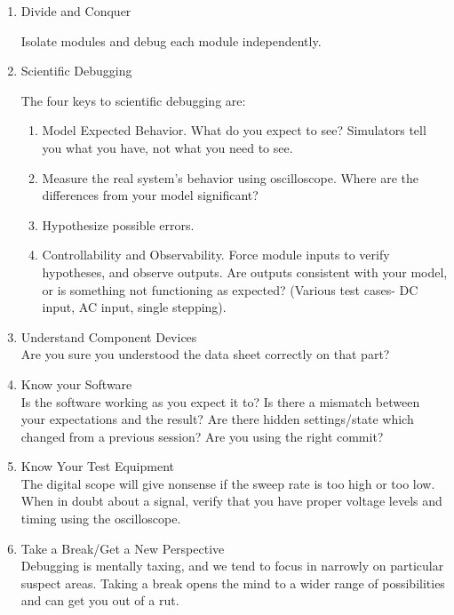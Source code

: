 \documentclass[11pt]{article}
\begin{document}
\begin{enumerate}
\item
Divide and Conquer

Isolate modules and debug each module independently.

\item 
Scientific Debugging

The four keys to scientific debugging are:
\begin{enumerate}
\item 
Model Expected Behavior. What do you expect to see?
Simulators tell you what you have, not what you need to see.
\item
Measure the real system's behavior using oscilloscope. 
Where are the differences from your model significant?
\item
Hypothesize possible errors.
\item
Controllability and Observability. Force module inputs
to verify hypotheses, and observe outputs. Are outputs consistent
with your model, or is something not functioning as expected?
(Various test cases- DC input, AC input, single stepping).

\end{enumerate}

\item
Understand Component Devices\\
Are you sure you understood the data sheet correctly on
that part?

\item
Know your Software\\
Is the software working as you expect it to? 
Is there a mismatch between your expectations and the result?
Are there hidden settings/state which changed from a previous session?
Are you using the right commit?

\item
Know Your Test Equipment\\
The digital scope will give nonsense if the sweep rate is
too high or too low. 
When in doubt about a signal,
verify that you have proper voltage levels and timing
using the oscilloscope.

\item
Take a Break/Get a New Perspective\\
Debugging is mentally taxing, and we tend to focus in
narrowly on particular suspect areas. Taking a break opens
the mind to a wider range of possibilities and can get
you out of a rut.

\end{enumerate}
\end{document}
